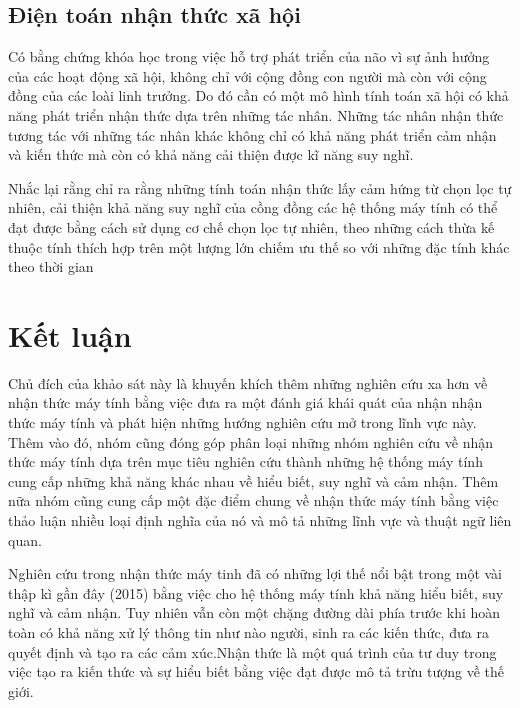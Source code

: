 \documentclass{article}
\begin{document}
\subsection{Điện toán nhận thức xã hội} \label{sec:5c-social-cognitive-computing}

Có bằng chứng khóa học trong việc hỗ trợ phát triển của não vì sự ảnh hưởng của các hoạt động xã hội, không chỉ với cộng đồng con người  mà còn với cộng đồng của các loài linh trưởng. Do đó cần có một mô hình tính toán xã hội có khả năng phát triển nhận thức dựa trên những tác nhân. Những tác nhân nhận thức tương tác với những tác nhân khác không chỉ có khả năng phát triển cảm nhận và kiến thức mà còn có khả năng cải thiện được kĩ năng suy nghĩ.

Nhắc lại rằng  chỉ ra rằng những tính toán nhận thức lấy cảm hứng từ chọn lọc tự nhiên, cải thiện khả năng suy nghĩ của cồng đồng các hệ thống máy tính có thể đạt được bằng cách sử dụng cơ chế chọn lọc tự nhiên, theo những cách thừa kế thuộc tính thích hợp trên một lượng lớn chiếm ưu thế so với những đặc tính khác theo thời gian

\section{Kết luận}\label{sec:5-conclusion}
Chủ đích của khảo sát này là khuyến khích thêm những nghiên cứu xa hơn về nhận thức máy tính bằng việc đưa ra một đánh giá khái quát của nhận nhận thức máy tính và phát hiện những hướng nghiên cứu mở trong lĩnh vực này. Thêm vào đó, nhóm cũng đóng góp phân loại những nhóm nghiên cứu về nhận thức máy tính dựa trên mục tiêu nghiên cứu thành những hệ thống máy tính cung cấp những khả năng khác nhau về hiểu biết, suy nghĩ và cảm nhận. Thêm nữa nhóm cũng cung cấp một đặc điểm chung về nhận thức máy tính bằng việc thảo luận nhiều loại định nghĩa của nó và mô tả những lĩnh vực và thuật ngữ liên quan.

Nghiên cứu trong nhận thức máy tinh đã có những lợi thế nổi bật trong một vài thập kì gần đây (2015) bằng việc cho hệ thống máy tính khả năng hiểu biết, suy nghĩ và cảm nhận. Tuy nhiên vẫn còn một chặng đường dài phía trước khi hoàn toàn có khả năng xử lý thông tin như nào người, sinh ra các kiến thức, đưa ra quyết định và tạo ra các cảm xúc.Nhận thức là một quá trình của tư duy trong việc tạo ra kiến thức và sự hiểu biết bằng việc đạt được mô tả trừu tượng về thế giới.



\end{document}
